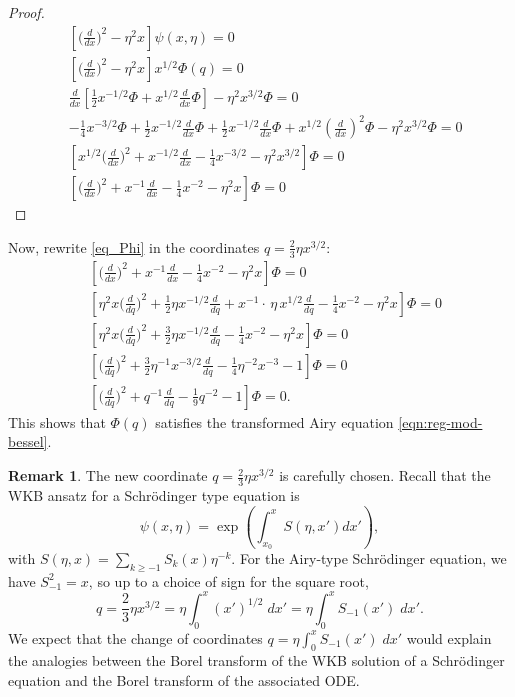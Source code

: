 \documentclass{article}
\theoremstyle{definition}
\newtheorem{remark}[definition]{Remark}
\theoremstyle{plain}
\begin{document}
\begin{proof}
\begin{align*}
&\left[\big(\tfrac{d}{dx}\big)^2 - \eta^2 x \right] \psi(x, \eta) = 0\\
&\left[\big(\tfrac{d}{dx}\big)^2 - \eta^2 x \right] x^{1/2}\Phi(q) = 0\\
&\frac{d}{dx}\left[\tfrac{1}{2}x^{-1/2}\Phi+x^{1/2}\tfrac{d}{dx}\Phi\right]-\eta^2x^{3/2}\Phi=0\\
&-\tfrac{1}{4}x^{-3/2}\Phi+\tfrac{1}{2}x^{-1/2}\tfrac{d}{dx}\Phi+\tfrac{1}{2}x^{-1/2}\tfrac{d}{dx}\Phi+x^{1/2}\left(\tfrac{d}{dx}\right)^2\Phi-\eta^2x^{3/2}\Phi=0\\
&\left[x^{1/2}\big(\tfrac{d}{dx}\big)^2+x^{-1/2}\tfrac{d}{dx}-\tfrac{1}{4}x^{-3/2}-\eta^2x^{3/2}\right]\Phi=0\\
&\left[\big(\tfrac{d}{dx}\big)^2+x^{-1}\tfrac{d}{dx}-\tfrac{1}{4}x^{-2}-\eta^2x\right]\Phi=0
\end{align*}
\end{proof}
Now, rewrite \eqref{eq_Phi} in the coordinates $q=\frac{2}{3}\eta x^{3/2}$: 
\begin{align*}
&\left[\big(\tfrac{d}{dx}\big)^2+x^{-1}\tfrac{d}{dx}-\tfrac{1}{4}x^{-2}-\eta^2x\right]\Phi=0\\
&\left[\eta^2x\big(\tfrac{d}{dq}\big)^2+\frac{1}{2}\eta x^{-1/2}\tfrac{d}{dq}+x^{-1}\cdot\, \eta\,  x^{1/2}\tfrac{d}{dq}-\tfrac{1}{4}x^{-2}-\eta^2x\right]\Phi=0\\
&\left[\eta^2x\big(\tfrac{d}{dq}\big)^2+\tfrac{3}{2}\eta x^{-1/2}\tfrac{d}{dq}-\tfrac{1}{4}x^{-2}-\eta^2x\right]\Phi=0\\
&\left[\big(\tfrac{d}{dq}\big)^2+\tfrac{3}{2}\eta^{-1} x^{-3/2}\tfrac{d}{dq}-\tfrac{1}{4}\eta^{-2}x^{-3}-1\right]\Phi=0\\
&\left[\big(\tfrac{d}{dq}\big)^2+q^{-1}\tfrac{d}{dq}-\tfrac{1}{9}q^{-2}-1\right]\Phi=0.
\end{align*}
This shows that $\Phi(q)$ satisfies the transformed Airy equation \eqref{eqn:reg-mod-bessel}. 

\begin{remark}
The new coordinate $q = \frac{2}{3}\eta x^{3/2}$ is carefully chosen. Recall that the WKB ansatz for a Schr\"{o}dinger type equation is
\begin{equation}
\psi(x,\eta) = \exp\left(\int_{x_0}^xS(\eta,x')dx'\right),
\end{equation}
with $S(\eta,x)=\sum_{k\geq -1}S_k(x)\eta^{-k}$. For the Airy-type Schr\"odinger equation, we have $S_{-1}^2 = x$, so up to a choice of sign for the square root,
\[ q = \frac{2}{3}\eta x^{3/2}=\eta\int_0^x (x')^{1/2}\;dx' = \eta\int_{0}^x S_{-1}(x')\;dx'. \]
We expect that the change of coordinates $q=\eta\int_0^{x}S_{-1}(x')\;dx'$ would explain the analogies between the Borel transform of the WKB solution of a Schr\"{o}dinger equation and the Borel transform of the associated ODE.  
\end{remark} 
%
\end{document}
